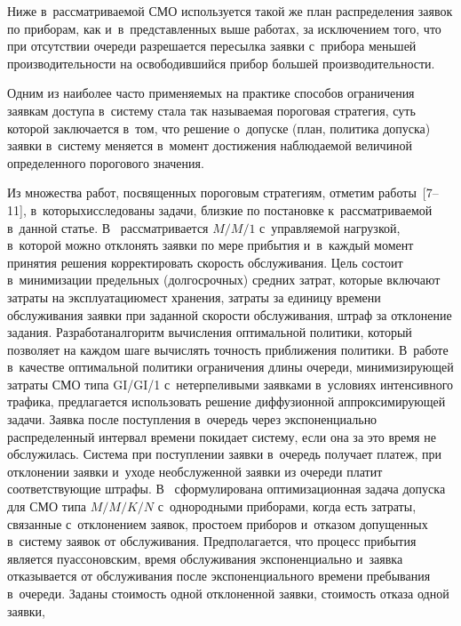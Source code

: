\begin{multicols}{2}
Ниже в~рассматриваемой СМО используется такой же план
распределения заявок по приборам, как и~в~представленных выше работах, за
исключением того, что при отсутствии очереди разрешается пересылка заявки
с~прибора меньшей производительности на освободившийся прибор большей
производительности.

Одним из наиболее часто применяемых на практике способов ограничения
заявкам доступа в~сис\-те\-му стала так называемая пороговая стратегия, суть
которой заключается в~том, что решение о~допуске (план, политика допуска)
заявки в~систему меняется в~момент достижения наблюдаемой величиной
определенного порогового значения. 

Из множества работ, посвященных
пороговым стратегиям, отметим работы~[7--11], в~которых\linebreak исследованы
задачи, близкие по постановке к~рас\-смат\-ри\-ва\-емой в~данной статье. 
В~\cite{7-ag} рассматривается $M/M/1$ с~управляемой нагрузкой, в~которой можно
отклонять заявки по мере прибытия и~в~каж\-дый момент принятия решения
корректировать скорость обслуживания. Цель состоит в~минимизации
предельных (долгосрочных) средних затрат, которые включают затраты на
эксплуатацию\linebreak мест хранения, затраты за единицу времени обслуживания
заявки при заданной скорости обслуживания, штраф за отклонение задания.
Разработан\linebreak алгоритм вы\-чис\-ле\-ния оптимальной политики, который позволяет на
каждом шаге вычислять точ\-ность приближения политики. В~работе~\cite{8-ag}
в~качестве оптимальной политики ограничения \mbox{длины} очереди,
минимизирующей затраты СМО типа GI/GI/1 с~нетерпеливыми заявками
в~условиях интенсивного трафика, предлагается использовать решение
диффузионной аппроксимирующей задачи. Заявка после поступления
в~очередь через экспоненциально распределенный интервал времени покидает
систему, если она за это время не обслужилась. Система при поступлении
заявки в~очередь получает платеж, при отклонении заявки и~уходе
необслуженной заявки из очереди платит соответствующие штрафы. В~\cite{9-
ag} сформулирована оптимизационная задача допуска для СМО типа
$M/M/K/N$ с~однородными приборами, когда есть затраты, связанные
с~отклонением заявок, простоем приборов и~отказом допущенных в~систему
заявок от обслуживания. Предполагается, что процесс прибытия является
пуассоновским, время обслуживания экспоненциально и~заявка отказывается
от обслуживания после экспоненциального времени пребывания в~очереди.
Заданы стоимость одной отклоненной заявки, стоимость отказа одной заявки,

\end{multicols}
